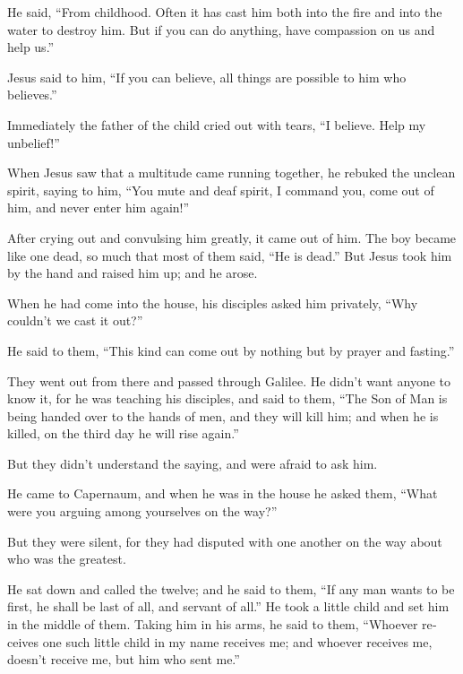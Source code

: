 \begin{paracol}{2}
\begin{otherlanguage}{english}
He said, ``From childhood.  Often it has cast him both
into the fire and into the water to destroy him. But if you can do
anything, have compassion on us and help us.''

 Jesus said to him, ``If you can believe, all things are
possible to him who believes.''

 Immediately the father of the child cried out with
tears, ``I believe. Help my unbelief!''

 When Jesus saw that a multitude came running together,
he rebuked the unclean spirit, saying to him, ``You mute and deaf
spirit, I command you, come out of him, and never enter him again!''

 After crying out and convulsing him greatly, it came out
of him. The boy became like one dead, so much that most of them said,
``He is dead.''  But Jesus took him by the hand and
raised him up; and he arose.

 When he had come into the house, his disciples asked him
privately, ``Why couldn't we cast it out?''

 He said to them, ``This kind can come out by nothing but
by prayer and fasting.''

 They went out from there and passed through Galilee. He
didn't want anyone to know it,  for he was teaching his
disciples, and said to them, ``The Son of Man is being handed over to
the hands of men, and they will kill him; and when he is killed, on the
third day he will rise again.''

 But they didn't understand the saying, and were afraid
to ask him.

 He came to Capernaum, and when he was in the house he
asked them, ``What were you arguing among yourselves on the way?''

 But they were silent, for they had disputed with one
another on the way about who was the greatest.

 He sat down and called the twelve; and he said to them,
``If any man wants to be first, he shall be last of all, and servant of
all.''  He took a little child and set him in the middle
of them. Taking him in his arms, he said to them, 
``Whoever receives one such little child in my name receives me; and
whoever receives me, doesn't receive me, but him who sent me.''


\end{otherlanguage}
\end{paracol}
